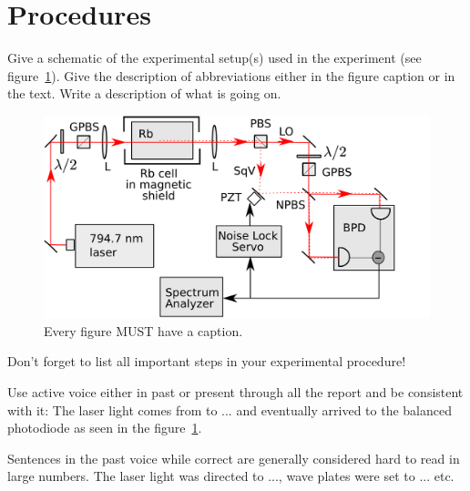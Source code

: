 \documentclass[letterpaper,12pt]{article}
\begin{document}
\section{Procedures}

Give a schematic of the experimental setup(s) used in the experiment (see
figure~\ref{fig:samplesetup}). Give the description of  abbreviations
either in the figure caption or in the text. Write a description of what is
going on. 

\begin{figure}[ht] 
        \centering \includegraphics[width=0.8\columnwidth]{sr_setup}
        \caption{
                \label{fig:samplesetup} %
                Every figure MUST have a caption.
        }
\end{figure}

Don't forget to list all important steps in your experimental procedure!

Use active voice either in past or present through all the report and be
consistent with it:
The laser light comes  from to ... and eventually arrived to the
balanced photodiode as seen in the figure~\ref{fig:samplesetup}.

Sentences in the past voice while correct are generally considered hard to read
in large numbers. The laser light was directed to ..., wave plates were set
to ... etc.
\end{document}
